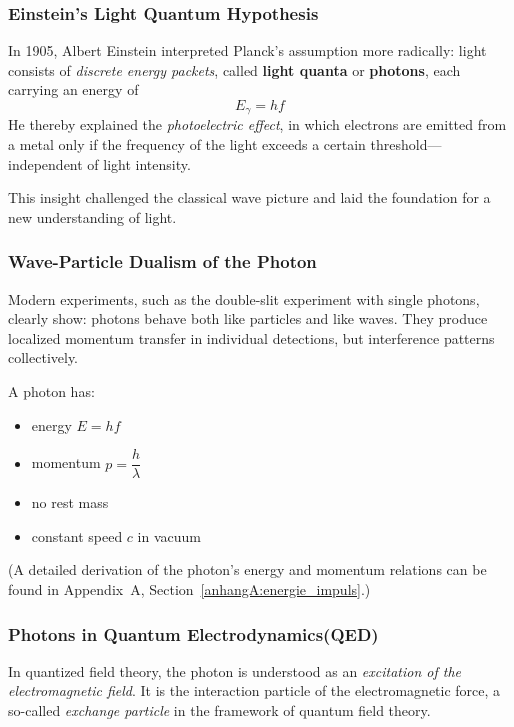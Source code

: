 \subsubsection{Einstein’s Light Quantum Hypothesis}

In 1905, Albert Einstein interpreted Planck’s assumption more radically: light consists of \emph{discrete energy packets}, called \textbf{light quanta} or \textbf{photons}, each carrying an energy of
\begin{equation}
	E_\gamma = h f
\end{equation}
He thereby explained the \emph{photoelectric effect}, in which electrons are emitted from a metal only if the frequency of the light exceeds a certain threshold—independent of light intensity.

This insight challenged the classical wave picture and laid the foundation for a new understanding of light.

\subsubsection{Wave-Particle Dualism of the Photon}

Modern experiments, such as the double-slit experiment with single photons, clearly show: photons behave both like particles and like waves. They produce localized momentum transfer in individual detections, but interference patterns collectively.

A photon has:
\begin{itemize}
	\item energy $E = h f$
	\item momentum $p = \dfrac{h}{\lambda}$
	\item no rest mass
	\item constant speed $c$ in vacuum
\end{itemize}
(A detailed derivation of the photon’s energy and momentum relations can be found in Appendix~A, Section~\ref{anhangA:energie_impuls}.)

\subsubsection{Photons in Quantum Electrodynamics\newline (QED)}

In quantized field theory, the photon is understood as an \emph{excitation of the electromagnetic field}. It is the interaction particle of the electromagnetic force, a so-called \emph{exchange particle} in the framework of quantum field theory.

